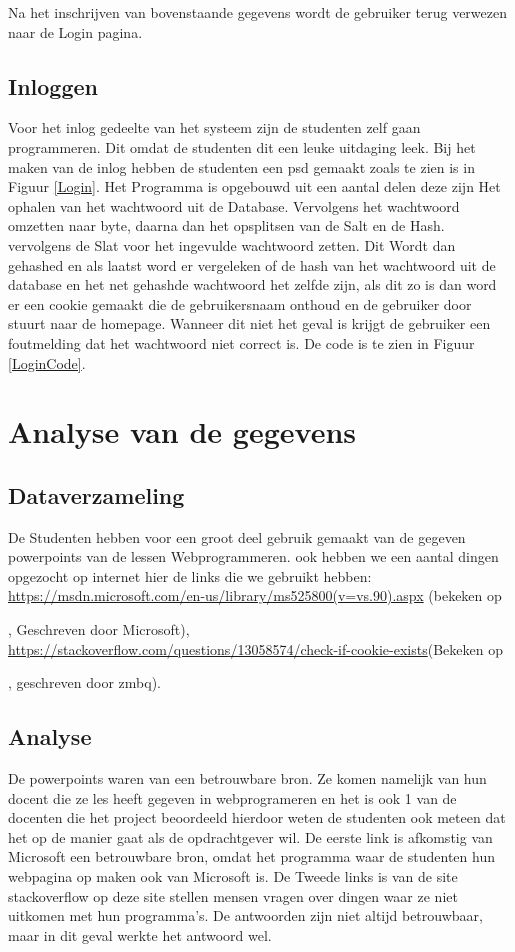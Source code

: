 \documentclass[11pt]{article}
\begin{document}
Na het inschrijven van bovenstaande gegevens wordt de gebruiker terug verwezen naar de Login pagina.
	
	\subsection{Inloggen}
	Voor het inlog gedeelte van het systeem zijn de studenten zelf gaan programmeren. Dit omdat de studenten dit een leuke uitdaging leek. Bij het maken van de inlog hebben de studenten een psd gemaakt zoals te zien is in Figuur \ref{Login}. Het Programma is opgebouwd uit een aantal delen deze zijn Het ophalen van het wachtwoord uit de Database. Vervolgens het wachtwoord omzetten naar byte, daarna dan het opsplitsen van de Salt en de Hash. vervolgens de Slat voor het ingevulde wachtwoord zetten. Dit Wordt dan gehashed en als laatst word er vergeleken of de hash van het wachtwoord uit de database en het net gehashde wachtwoord het zelfde zijn, als dit zo is dan word er een cookie gemaakt die de gebruikersnaam onthoud en de gebruiker door stuurt naar de homepage. Wanneer dit niet het geval is krijgt de gebruiker een foutmelding dat het wachtwoord niet correct is. De code is te zien in Figuur \ref{LoginCode}.
	\newpage
	
	\section{Analyse van de gegevens}
	
	\subsection{Dataverzameling}
	De Studenten hebben voor een groot deel gebruik gemaakt van de gegeven powerpoints van de lessen Webprogrammeren. ook hebben we een aantal dingen opgezocht op internet hier de links die we gebruikt hebben: \url{https://msdn.microsoft.com/en-us/library/ms525800(v=vs.90).aspx} (bekeken op \date{19-01-2018}, Geschreven door Microsoft), \newline \url{https://stackoverflow.com/questions/13058574/check-if-cookie-exists}(Bekeken op \date{19-01-2018}, geschreven door zmbq).
	
	\subsection{Analyse}
	De powerpoints waren van een betrouwbare bron. Ze komen namelijk van hun docent die ze les heeft gegeven in webprogrameren en het is ook 1 van de docenten die het project beoordeeld hierdoor weten de studenten ook meteen dat het op de manier gaat als de opdrachtgever wil. De eerste link is afkomstig van Microsoft een betrouwbare bron, omdat het programma waar de studenten hun webpagina op maken ook van Microsoft is. De Tweede links is van de site stackoverflow op deze site stellen mensen vragen over dingen waar ze niet uitkomen met hun programma's. De antwoorden zijn niet altijd betrouwbaar, maar in dit geval werkte het antwoord wel.
\end{document}
